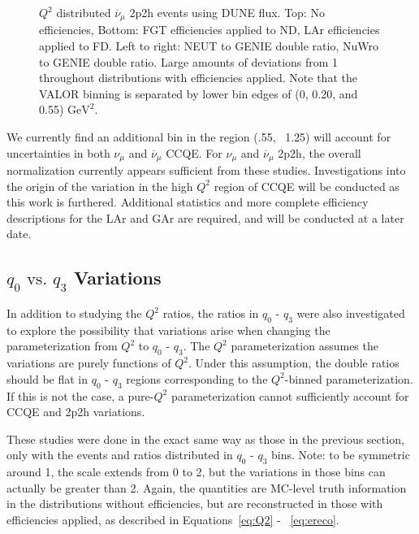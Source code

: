 \documentclass[12pt]{article}
\begin{document}
\begin{figure}[h]
\endminipage
\caption{$Q^2$ distributed $\overline{\nu}_{\mu}$ 2p2h events using DUNE flux. Top: No efficiencies, Bottom: FGT efficiencies applied to ND, LAr efficiencies applied to FD. Left to right: NEUT to GENIE double ratio, NuWro to GENIE double ratio. Large amounts of deviations from 1 throughout distributions with efficiencies applied. Note that the VALOR binning is separated by lower bin edges of (0, 0.20, and 0.55) $\textrm{GeV}^2$.}
\label{fig:Q2_2p2h_numubar_no_eff}
\end{figure}
\FloatBarrier

We currently find an additional bin in the region (.55, ~1.25) will account for uncertainties in both $\nu_{\mu}$ and $\overline{\nu}_{\mu}$ CCQE. For $\nu_{\mu}$ and $\overline{\nu}_{\mu}$ 2p2h, the overall normalization currently appears sufficient from these studies. Investigations into the origin of the variation in the high $Q^2$ region of CCQE will be conducted as this work is furthered. Additional statistics and more complete efficiency descriptions for the LAr and GAr are required, and will be conducted at a later date.

\subsection{$q_0 \textrm{ vs. } q_3$ Variations}
\label{subsec:q0q3}
In addition to studying the $Q^2$ ratios, the ratios in $q_0 \textrm{ - } q_3$ were also investigated to explore the possibility that variations arise when changing the parameterization from $Q^2$ to $q_0 \textrm{ - } q_3$. The $Q^2$ parameterization assumes the variations are purely functions of $Q^2$. Under this assumption, the double ratios should be flat in $q_0 \textrm{ - } q_3$ regions corresponding to the $Q^2$-binned parameterization. If this is not the case, a pure-$Q^2$ parameterization cannot sufficiently account for CCQE and 2p2h variations.

These studies were done in the exact same way as those in the previous section, only with the events and ratios distributed in $q_0 \textrm{ - } q_3$ bins. Note: to be symmetric around 1, the scale extends from 0 to 2, but the variations in those bins can actually be greater than 2. Again, the quantities are MC-level truth information in the distributions without efficiencies, but are reconstructed in those with efficiencies applied, as described in Equations~\ref{eq:Q2} - ~\ref{eq:ereco}.
\end{document}
